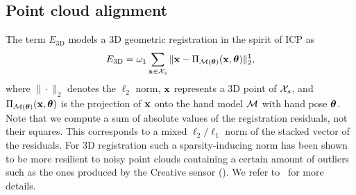 %
%
%
%
%


\subsection*{Point cloud alignment}
The term $E_{\text{3D}}$ models a 3D geometric registration in the spirit of ICP as
%
\begin{equation}
    E_{\text{3D}}  = \omega_1 \sum_{\mathbf{x} \in \mathcal{X}_{s}} \| \mathbf{x} - \Pi_{\mathcal{M}(\boldsymbol{\theta})}(\mathbf{x},\boldsymbol{\theta}) \|_2^1,
\label{eq:align3d}
\end{equation}
%
where $\|\cdot\|_2$ denotes the $\ell_2$ norm, $\mathbf{x}$ represents a 3D point of $\mathcal{X}_{s}$, and $\Pi_{\mathcal{M}(\boldsymbol{\theta})}(\mathbf{x},\boldsymbol{\theta})$ is the projection of $\mathbf{x}$ onto the hand model $\mathcal{M}$ with hand pose $\boldsymbol{\theta}$. 
%
 Note that we compute a sum of absolute values of the registration residuals, not their squares. This corresponds to a mixed $\ell_{2}/\ell_{1}$ norm of the stacked vector of the residuals. For 3D registration such a sparsity-inducing norm has been shown to be more resilient to noisy point clouds containing a certain amount of outliers
such as the ones produced by the Creative sensor (). We refer to~\cite{Bouaziz_eg2014} for more details.

